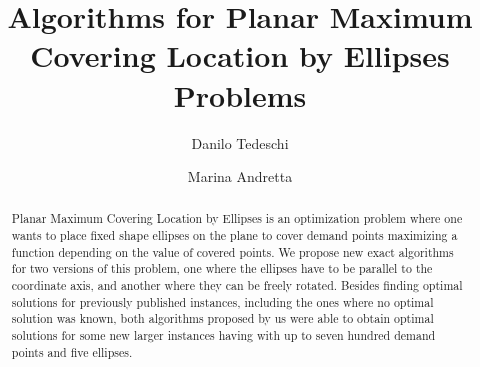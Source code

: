 \documentclass[3p, 11pt]{elsarticle}
\begin{document}
	
	\begin{frontmatter}
		
		
		\title{Algorithms for Planar Maximum Covering Location by Ellipses Problems}
		
		
		
		
		\author[1]{Danilo Tedeschi}

		
		\author[2]{Marina Andretta}
					
		
		
		\begin{abstract}
			Planar Maximum Covering Location by Ellipses is an optimization problem where one wants to place fixed shape ellipses on the plane to cover demand points
			maximizing a function depending on the value of covered points.
			We propose new exact algorithms for two versions of this problem, one where the ellipses have to be parallel to the coordinate axis, and another where they can be freely rotated. 
			Besides finding optimal solutions for previously published instances, including the ones where no optimal solution was known, both algorithms proposed by us were able to obtain optimal solutions for some new larger instances having with up to seven hundred demand points and five ellipses.
		\end{abstract}
		

\end{frontmatter}
\end{document}
